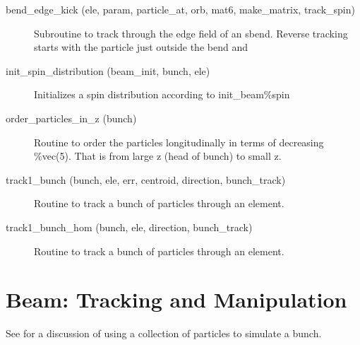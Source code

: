 \begin{description}

\label{r:bend.edge.kick}
\item[bend_edge_kick (ele, param, particle_at, orb, mat6, make_matrix, track_spin)] \Newline 
Subroutine to track through the edge field of an sbend.
Reverse tracking starts with the particle just outside the bend and

\label{r:init.spin.distribution}
\item[init_spin_distribution (beam_init, bunch, ele)] \Newline 
Initializes a spin distribution according to init_beam\%spin

\label{r:order.particles.in.z}
\item[order_particles_in_z (bunch)] \Newline 
Routine to order the particles longitudinally in terms of decreasing \%vec(5).
That is from large z (head of bunch) to small z.

\label{r:track1.bunch}
\item[track1_bunch (bunch, ele, err, centroid, direction, bunch_track)] \Newline 
Routine to track a bunch of particles through an element.

\label{r:track1.bunch.hom}
\item[track1_bunch_hom (bunch, ele, direction, bunch_track)] \Newline 
Routine to track a bunch of particles through an element.

\end{description}

\section{Beam: Tracking and Manipulation}
\label{r:beam}    

See  for a discussion of using a collection of particles to simulate
a bunch.

